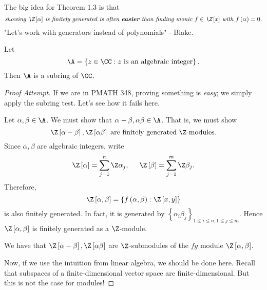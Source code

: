 \documentclass[pmath441]{subfiles}
\begin{document}
    \np The big idea for Theorem 1.3 is that
    \begin{equation*}
        \text{\textit{showing $\Z\left[ \alpha \right]$ is finitely generated is often \textbf{easier} than finding monic $f\in\Z\left[ x \right]$ with $f\left( \alpha \right) = 0$.}}
    \end{equation*}
    "Let's work with generators instead of polynomials" - Blake.
    
    \begin{theorem}{}
        Let
        \begin{equation*}
            \A = \left\lbrace z\in\CC: z\text{ is an algebraic integer} \right\rbrace.
        \end{equation*}
        Then $\A$ is a subring of $\CC$.
    \end{theorem}

    \begin{proof}[Proof Attempt]
        If we are in PMATH 348, proving something is \textit{easy}; we simply apply the subring test. Let's see how it fails here.

        Let $\alpha,\beta\in\A$. We must show that $\alpha-\beta, \alpha\beta\in\A$. That is, we must show
        \begin{equation*}
            \Z\left[ \alpha-\beta \right],\Z\left[ \alpha\beta \right]\text{ are finitely generated $\Z$-modules}.
        \end{equation*}
        Since $\alpha,\beta$ are algebraic integers, write
        \begin{equation*}
            \Z\left[ \alpha \right] = \sum^{n}_{j=1} \Z\alpha_j, \hspace{0.5cm} \Z\left[ \beta \right] = \sum^{m}_{j=1} \Z\beta_j.
        \end{equation*}
        Therefore,
        \begin{equation*}
            \Z\left[ \alpha,\beta \right] = \left\lbrace f\left( \alpha,\beta \right): \Z\left[ x,y \right] \right\rbrace
        \end{equation*}
        is also finitely generated. In fact, it is generated by $\left\lbrace \alpha_i\beta_j \right\rbrace^{}_{1\leq i\leq n, 1\leq j\leq m}$. Hence $\Z\left[ \alpha,\beta \right]$ is finitely generated as a $\Z$-module.

        We have that $\Z\left[ \alpha-\beta \right], \Z\left[ \alpha\beta \right]$ are $\Z$-submodules of the $fg$ module $\Z\left[ \alpha,\beta \right]$.

        Now, if we use the intuition from linear algebra, we should be done here. Recall that subspaces of a finite-dimensional vector space are finite-dimensional. But this is not the case for modules!

    \end{proof}
\end{document}
